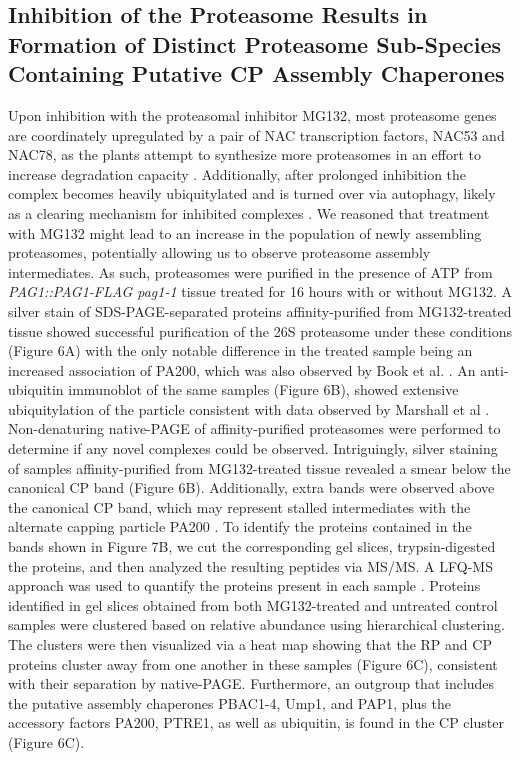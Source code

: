 \subsection{Inhibition of the Proteasome Results in Formation of Distinct Proteasome Sub-Species Containing Putative CP Assembly Chaperones}
Upon inhibition with the proteasomal inhibitor MG132, most proteasome genes are coordinately upregulated by a pair of NAC transcription factors, NAC53 and NAC78, as the plants attempt to synthesize more proteasomes in an effort to increase degradation capacity \citep{gladman16}. Additionally, after prolonged inhibition the complex becomes heavily ubiquitylated and is turned over via autophagy, likely as a clearing mechanism for inhibited complexes \citep{marshall15}. We reasoned that treatment with MG132 might lead to an increase in the population of newly assembling proteasomes, potentially allowing us to observe proteasome assembly intermediates. As such, proteasomes were purified in the presence of ATP from \textit{PAG1::PAG1-FLAG pag1-1} tissue treated for 16 hours with or without MG132. A silver stain of SDS-PAGE-separated proteins affinity-purified from MG132-treated tissue showed successful purification of the 26S proteasome under these conditions (Figure 6A) with the only notable difference in the treated sample being an increased association of PA200, which was also observed by Book et al. \citep{book10}. An anti-ubiquitin immunoblot of the same samples (Figure 6B), showed extensive ubiquitylation of the particle consistent with data observed by Marshall et al \citep{marshall15}.
Non-denaturing native-PAGE of affinity-purified proteasomes were performed to determine if any novel complexes could be observed. Intriguingly, silver staining of samples affinity-purified from MG132-treated tissue revealed a smear below the canonical CP band (Figure 6B). Additionally, extra bands were observed above the canonical CP band, which may represent stalled intermediates with the alternate capping particle PA200 \citep{li07}. To identify the proteins contained in the bands shown in Figure 7B, we cut the corresponding gel slices, trypsin-digested the proteins, and then analyzed the resulting peptides via MS/MS. A LFQ-MS approach was used to quantify the proteins present in each sample \citep{gemperline16}. Proteins identified in gel slices obtained from both MG132-treated and untreated control samples were clustered based on relative abundance using hierarchical clustering. The clusters were then visualized via a heat map showing that the RP and CP proteins cluster away from one another in these samples (Figure 6C), consistent with their separation by native-PAGE. Furthermore, an outgroup that includes the putative assembly chaperones PBAC1-4, Ump1, and PAP1, plus the accessory factors PA200, PTRE1, as well as ubiquitin, is found in the CP cluster (Figure 6C). 
